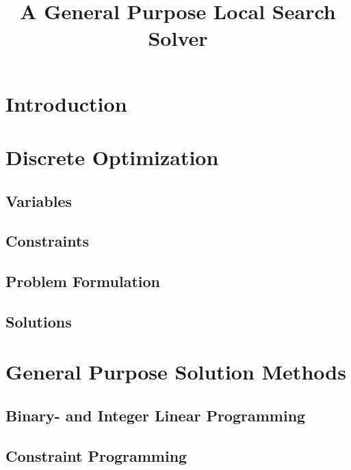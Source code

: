 \documentclass[a4paper,11pt]{article}
\title{A General Purpose Local Search Solver}
\begin{document}
\maketitle

\tableofcontents
\newpage
\section{Introduction}
 
 
 
\section{Discrete Optimization}

  \subsection{Variables} 
  \subsection{Constraints}
  \subsection{Problem Formulation} %
  
  \subsection{Solutions}
  
  
\newpage  
\section{General Purpose Solution Methods}  
  
  \subsection{Binary- and Integer Linear Programming} %
  
  
  \subsection{Constraint Programming}
  
\end{document}
